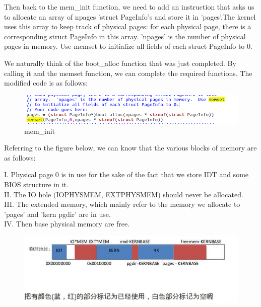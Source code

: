 Then back to the mem\_init function, we need to add an instruction that asks us to allocate an array of npages 'struct PageInfo's and store it in 'pages'.The kernel uses this array to keep track of physical pages: for each physical page, there is a corresponding struct PageInfo in this array.  'npages' is the number of physical pages in memory.  Use memset to initialize all fields of each struct PageInfo to 0.

We naturally think of the boot\_alloc function that was just completed. By calling it and the memset function, we can complete the required functions. The modified code is as follows:
\begin{figure}[H]
\centering
\includegraphics[width=0.8\linewidth]{figure/changed_mem_init}
\caption{mem\_init}
\end{figure}

Referring to the figure below, we can know that the various blocks of memory are as follows:
\begin{flushleft}
I. Physical page 0 is in use for the sake of the fact that we store IDT and
some BIOS structure in it.\\
II. The IO hole (IOPHYSMEM, EXTPHYSMEM) should never be allocated.\\
III. The extended memory, which mainly refer to the memory we allocate to
'pages' and 'kern pgdir' are in use.\\
IV. Then base physical memory are free.\\
\end{flushleft}
\begin{figure}[H]
\centering
\includegraphics[width=0.8\linewidth]{figure/page_init_pic}
\end{figure}

